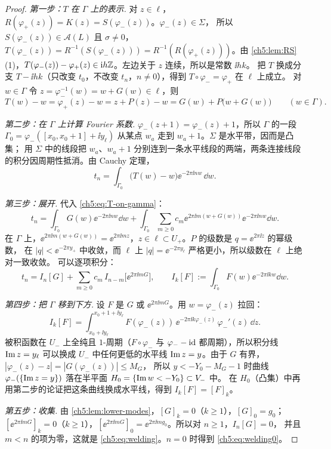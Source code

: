 \begin{proof}
\emph{第一步：$T$ 在 $\Gamma$ 上的表示.} 对 $z\in\ell$，$R(\varphi_+(z))=K(z)=S(\varphi_-(z))$。$\varphi_-(z)\in\Sigma$，
所以 $S(\varphi_-(z))\in\mathcal A(L)$ 且 $\sigma\ne0$，$T(\varphi_-(z))=R^{-1}(S(\varphi_-(z)))=R^{-1}(R(\varphi_+(z)))$。由
\cref{ch5:lem:RS}(1)，$T(\varphi_-(z))-\varphi_+(z)\in\mathrm{i} h\mathbb{Z}$。左边关于 $z$ 连续，所以是常数 $\ii hk$。
把 $T$ 换成分支 $T-\ii hk$（只改变 $t_0$，不改变 $t_n$，$n\ne0$），得到 $T\circ\varphi_-=\varphi_+$ 在 $\ell$ 上成立。
对 $w\in\Gamma$ 令 $z=\varphi_-^{-1}(w)=w+G(w)\in\ell$，则
\begin{equation}\label{ch5:eq:T-on-gamma}
 T(w)-w=\varphi_+(z)-w=z+P(z)-w=G(w)+P\bigl(w+G(w)\bigr)\qquad(w\in\Gamma).
\end{equation}

\emph{第二步：在 $\Gamma$ 上计算 Fourier 系数.} $\varphi_-(z+1)=\varphi_-(z)+1$，所以 $\Gamma$ 的一段
$\Gamma_0=\varphi_-([x_0,x_0+1]+\ii y_\ell)$ 从某点 $w_a$ 走到 $w_a+1$。$\Sigma$ 是水平带，因而是凸集；
用 $\Sigma$ 中的线段把 $w_a$、$w_a+1$ 分别连到一条水平线段的两端，两条连接线段的积分因周期性抵消。由 Cauchy 定理，
\[
 t_n=\int_{\Gamma_0}\bigl(T(w)-w\bigr)\ee^{-2\pi\ii nw}\,\dd w .
\]

\emph{第三步：展开.} 代入 \eqref{ch5:eq:T-on-gamma}：
\[
 t_n=\int_{\Gamma_0}G(w)\ee^{-2\pi\ii nw}\dd w+\int_{\Gamma_0}\sum_{m\ge0}c_m\ee^{2\pi\ii m(w+G(w))}\ee^{-2\pi\ii nw}\dd w .
\]
在 $\Gamma$ 上，$\ee^{2\pi\ii m(w+G(w))}=\ee^{2\pi\ii mz}$，$z\in\ell\subset U_+$。$P$ 的级数是 $q=\ee^{2\pi\ii z}$ 的幂级数，
在 $|q|<\ee^{-2\pi y_+}$ 中收敛，而 $\ell$ 上 $|q|=\ee^{-2\pi y_\ell}$ 严格更小，所以级数在 $\ell$ 上绝对一致收敛。
可以逐项积分：
\[
 t_n=I_n[G]+\sum_{m\ge0}c_m\,I_{n-m}\bigl[\ee^{2\pi\ii mG}\bigr],\qquad
 I_k[F]:=\int_{\Gamma_0}F(w)\ee^{-2\pi\ii kw}\dd w .
\]

\emph{第四步：把 $\Gamma$ 移到下方.} 设 $F$ 是 $G$ 或 $\ee^{2\pi\ii mG}$。用 $w=\varphi_-(z)$ 拉回：
\[
 I_k[F]=\int_{x_0+\ii y_\ell}^{x_0+1+\ii y_\ell}F(\varphi_-(z))\,\ee^{-2\pi\ii k\varphi_-(z)}\,\varphi_-'(z)\,\dd z .
\]
被积函数在 $U_-$ 上全纯且 $1$-周期（$F\circ\varphi_-$ 与 $\varphi_--\mathrm{id}$ 都周期），所以积分线 $\operatorname{Im} z=y_\ell$ 可以换成
$U_-$ 中任何更低的水平线 $\operatorname{Im} z=y$。由于 $G$ 有界，$|\varphi_-(z)-z|=|G(\varphi_-(z))|\le M_G$，
所以 $y<-Y_0-M_G-1$ 时曲线 $\varphi_-(\{\operatorname{Im} z=y\})$ 落在半平面 $H_0=\{\operatorname{Im} w<-Y_0\}\subset V_-$ 中。
在 $H_0$（凸集）中再用第二步的论证把这条曲线换成水平线，得到 $I_k[F]=[F]_k$。

\emph{第五步：收集.} 由 \cref{ch5:lem:lower-modes}，$[G]_k=0$（$k\ge1$），$[G]_0=g_0$；
$[\ee^{2\pi\ii mG}]_k=0$（$k\ge1$），$[\ee^{2\pi\ii mG}]_0=\ee^{2\pi\ii mg_0}$。所以对 $n\ge1$，$I_n[G]=0$，
并且 $m<n$ 的项为零，这就是 \eqref{ch5:eq:welding}。$n=0$ 时得到 \eqref{ch5:eq:welding0}。
\end{proof}

